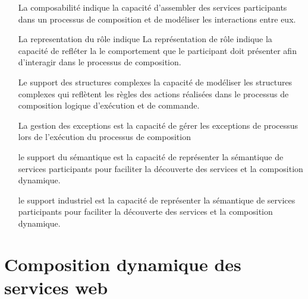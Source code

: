     \SpecialItem
    \begin{itemize}
      \item [La composabilité] indique la capacité
        d'assembler des services participants dans un processus de
        composition et de modéliser les interactions entre eux.

      \item [La representation du rôle] indique La représentation de
        rôle indique la capacité de refléter la le comportement que le
        participant doit présenter afin d'interagir dans le processus
        de composition.

      \item [Le support des structures complexes] la capacité de
        modéliser les structures complexes qui reflètent les règles
        des actions réalisées dans le processus de composition logique
        d'exécution et de commande.

      \item [La gestion des exceptions] est la capacité de gérer les
        exceptions de processus lors de l'exécution du processus de
        composition

      \item [le support du sémantique] est la capacité de représenter
        la sémantique de services participants pour faciliter la
        découverte des services et la composition dynamique.

      \item [le support industriel] est la capacité de représenter
        la sémantique de services participants pour faciliter la
        découverte des services et la composition dynamique.
    \end{itemize}


  \section{Composition dynamique des services web}
  \label{sec:comp-dynam}

